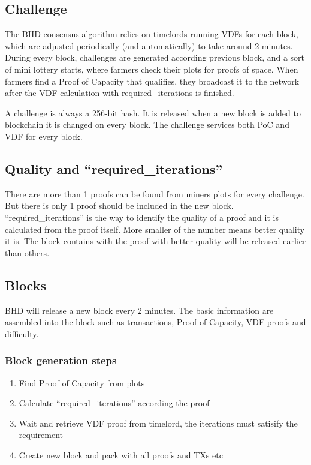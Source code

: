 \subsection{Challenge}
\begin{flushleft}
    The BHD consensus algorithm relies on timelords running VDFs for each block, which are adjusted periodically (and automatically) to take around 2 minutes. During every block, challenges are generated according previous block, and a sort of mini lottery starts, where farmers check their plots for proofs of space. When farmers find a Proof of Capacity that qualifies, they broadcast it to the network after the VDF calculation with required\_iterations is finished.
\end{flushleft}
\begin{flushleft}
    A challenge is always a 256-bit hash. It is released when a new block is added to blockchain it is changed on every block. The challenge services both PoC and VDF for every block.
\end{flushleft}
\subsection{Quality and ``required\_iterations''}
\begin{flushleft}
    There are more than 1 proofs can be found from miners plots for every challenge. But there is only 1 proof should be included in the new block. ``required\_iterations'' is the way to identify the quality of a proof and it is calculated from the proof itself. More smaller of the number means better quality it is. The block contains with the proof with better quality will be released earlier than others.
\end{flushleft}
\subsection{Blocks}
\begin{flushleft}
    BHD will release a new block every 2 minutes. The basic information are assembled into the block such as transactions, Proof of Capacity, VDF proofs and difficulty.
\end{flushleft}
\subsubsection{Block generation steps}
\begin{enumerate}
    \item Find Proof of Capacity from plots
    \item Calculate ``required\_iterations'' according the proof
    \item Wait and retrieve VDF proof from timelord, the iterations must satisify the requirement
    \item Create new block and pack with all proofs and TXs etc
\end{enumerate}

